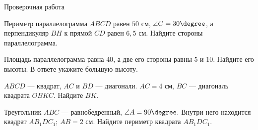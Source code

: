 \begin{exam}
	\begin{listofex}
		\item Проверочная работа
	\end{listofex}
\end{exam}

\begin{consultation}
	\begin{listofex}
		\item Периметр параллелограмма \( ABCD \) равен \( 50 \) см, \( \angle C = 30\degree \), а перпендикуляр \( BH \) к прямой \( CD \) равен \( 6,5 \) см. Найдите стороны параллелограмма.
		\item Площадь параллелограмма равна \( 40 \), а две его стороны равны \( 5 \) и \( 10 \). Найдите его высоты. В ответе укажите большую высоту.
		\item \( ABCD \) --- квадрат, \( AC \) и \( BD \) --- диагонали. \( AC = 4  \) см, \( BC \) --- диагональ квадрата \( OBKC \).  Найдите \( BK \).
		\item Треугольник \( ABC \) --- равнобедренный, \( \angle A=90\degree \). Внутри него находится квадрат \( AB_1DC_1 \); \( AB = 2 \) см. Найдите периметр квадрата \( AB_1DC_1  \).
	\end{listofex}
\end{consultation}
